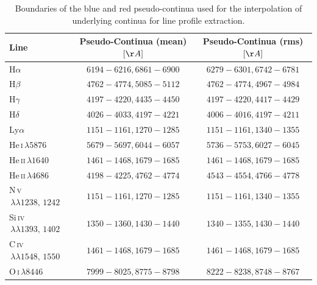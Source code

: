 \begin{table}[htbp]
	\centering
	\small
	\caption[Pseudo-continua boundaries of the line profiles]{Boundaries of the blue and red pseudo-continua used for the interpolation of underlying continua for line profile extraction.}
	\label{tab:line_profiles_pseudo}
	\begin{tabular}{lcc}
		\hline
		\hline
		\textbf{Line} & \textbf{\textbf{Pseudo-Continua (mean) $[\AA]$}} & \textbf{Pseudo-Continua (rms) $[\AA]$}  \\
		\hline
		\hline
		H$\alpha$ & $6194-6216, 6861-6900$ & $6279-6301, 6742-6781$ \\
		H$\beta$ & $4762-4774, 5085-5112$ & $4762-4774, 4967-4984$ \\
		H$\gamma$ & $4197-4220, 4435-4450$ & $4197-4220, 4417-4429$ \\
		H$\delta$ & $4026-4033, 4197-4221$ &$4006-4016, 4197-4211$  \\
		Ly$\alpha$ & $1151-1161, 1270-1285$  &  $1151-1161, 1340-1355$\\
		\hline
		He\,\textsc{i}$\,\lambda5876$ & $5679-5697, 6044-6057$ & $5736-5753, 6027-6045$ \\
		He\,\textsc{ii}$\,\lambda1640$  & $1461-1468, 1679-1685$ & $1461-1468, 1679-1685$\\
		He\,\textsc{ii}$\,\lambda4686$ & $4198-4225, 4762-4774$ & $4543-4554, 4766-4778$ \\
		\hline
		N\,\textsc{v}$\,\lambda\lambda 1238,\,1242 $ & $1151-1161, 1270-1285$  &  $1151-1161, 1340-1355$\\
		Si\,\textsc{iv}$\,\lambda\lambda 1393,\,1402 $ & $1350-1360, 1430-1440$ &  $1340-1355, 1430-1440$\\
		C\,\textsc{iv}$\,\lambda\lambda 1548,\,1550$ & $1461-1468, 1679-1685$  &  $ 1461-1468, 1679-1685$\\
		\hline
		O\,\textsc{i}$\,\lambda 8446$ & $7999-8025, 8775-8798$ & $8222-8238, 8748-8767$ \\
		
		\hline
		\hline
	\end{tabular}
\end{table}\\
